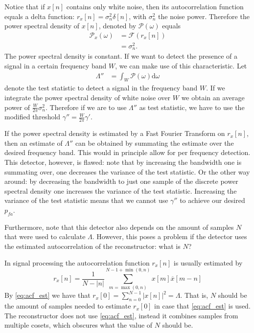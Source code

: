 \documentclass[a4paper, openany, oneside]{memoir}
\begin{document}
Notice that if $x[n]$ contains only white noise, then its autocorrelation function equals a delta function: $r_x[n] = \sigma_n^2\delta[n]$, with $\sigma_n^2$ the noise power. Therefore the power spectral density of $x[n]$, denoted by $\mathcal{P}(\omega)$ equals  
 \begin{align*}
 \mathcal{P}_x(\omega) &= \mathcal{F}(r_x[n])\\
  &= \sigma_n^2.
 \end{align*} The power spectral density is constant. If we want to detect the presence of a signal in a certain frequency band $W$, we can make use of this characteristic. Let
 \begin{align*}
 \Lambda'' &= \int_W \mathcal{P}(\omega) \text{d}\omega
 \end{align*}
denote the test statistic to detect a signal in the frequency band $W$.
 If we integrate the power spectral density of white noise over $W$ we obtain an average power of  $\frac{W}{2\pi} \sigma_n^2$. Therefore if we are to use $\Lambda''$ as test statistic, we have to use the modified threshold $\gamma'' = \frac{W}{2\pi} \gamma'$. 

 If the power spectral density is estimated by a Fast Fourier Transform on $r_x[n]$, then an estimate of $\Lambda''$ can be obtained by summating
 the estimate over the desired frequency band. This would in principle allow for per frequency detection. This detector, however, is flawed: note that by increasing the bandwidth one is summating over, one decreases the variance of the test statistic. Or the other way around: by decreasing the bandwidth to just one sample of the discrete power spectral density one increases the variance of the test statistic. Increasing the variance of the test statistic means that we cannot use $\gamma''$ to achieve our desired $p_{fa}$. 
 
Furthermore, note that this detector also depends on the amount of samples $N$ that were used to calculate $\Lambda$. However, this poses a problem if the detector uses the estimated autocorrelation of the reconstructor: what is $N$?

In signal processing the autocorrelation function $r_x[n]$ is usually estimated by 
\begin{equation}\label{eq:acf_est}
r_x[n] = \frac{1}{N-|n|}\sum_{m=\max(0,n)}^{N-1+\min(0,n)} x[m]\overline{x}[m-n]
\end{equation}
By \cref{eq:acf_est} we have that $r_x[0] = \sum_{n=0}^{N-1} |x[n]|^2 = \Lambda$. That is, $N$ should be the amount of samples needed to estimate $r_x[0]$ in case that \cref{eq:acf_est} is used. 
The reconstructor does not use \cref{eq:acf_est}, instead it combines samples from multiple cosets, which obscures what the value of $N$ should be. 
\end{document}
